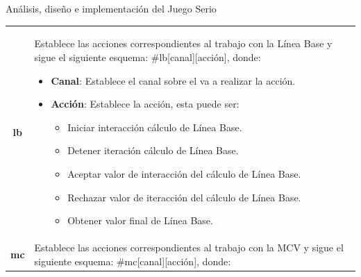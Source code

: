 \begin{thesischapter}{2} {Análisis, diseño e implementación del Juego Serio}
\begin{table}[h]
\begin{tabular}{ |c|p{14cm}|}
\begin{minipage}{14cm}
                                    \vspace{1pt}
                                \end{minipage}\\\hline
            \textbf{lb}     &   \begin{minipage}{14cm}
                                    \vspace{1pt}
                                    Establece las acciones correspondientes al trabajo con la Línea Base y sigue el siguiente esquema: \#lb[canal][acción], donde:
                                    \begin{itemize}
                                        \item \textbf{Canal}: Establece el canal sobre el va a realizar la acción.
                                        \item \textbf{Acción}: Establece la acción, esta puede ser: 
                                        \begin{itemize}
                                            \item Iniciar interacción cálculo de Línea Base.
                                            \item Detener iteración cálculo de Línea Base.
                                            \item Aceptar valor de interacción del cálculo de Línea Base.
                                            \item Rechazar valor de iteracción del cálculo de Línea Base.
                                            \item Obtener valor final de Línea Base.
                                        \end{itemize}
                                    \end{itemize} 
                                    \vspace{1pt}
                                \end{minipage}\\\hline
            \textbf{mc}     &   \begin{minipage}{14cm}
                                    \vspace{1pt}
                                    Establece las acciones correspondientes al trabajo con la MCV y sigue el siguiente esquema: \#mc[canal][acción], donde:

\end{minipage}
\end{tabular}
\end{table}
\end{thesischapter}

